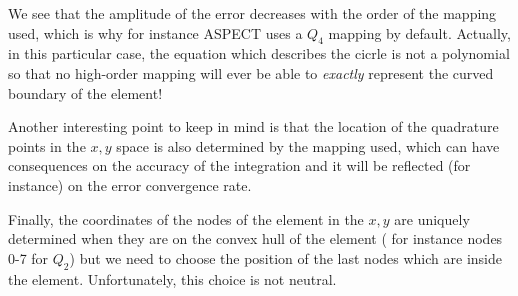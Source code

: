 We see that the amplitude of the error decreases with the order of the mapping used, 
which is why for instance ASPECT uses a $Q_4$ mapping by default.
Actually, in this particular case, the equation which describes the cicrle is not a 
polynomial so that no high-order mapping will ever be able to {\it exactly} 
represent the curved boundary of the element!

Another interesting point to keep in mind is that the location of the quadrature points
in the $x,y$ space is also determined by the mapping used, which can have consequences
on the accuracy of the integration and it will be reflected (for instance) on the 
error convergence rate.

Finally, the coordinates of the nodes of the element in the $x,y$ are 
uniquely determined when they are on the convex hull of the element (
for instance nodes 0-7 for $Q_2$) but we need to choose the position 
of the last nodes which are inside the element. Unfortunately, this choice is 
not neutral. 


\vspace{1cm}

\Literature \cite{yuhy94}








 
